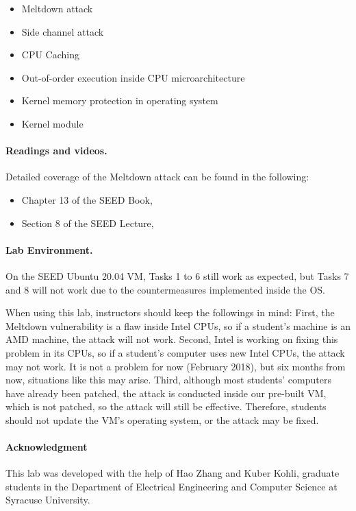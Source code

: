 \begin{itemize}[noitemsep]
\item Meltdown attack 
\item Side channel attack 
\item CPU Caching
\item Out-of-order execution inside CPU microarchitecture
\item Kernel memory protection in operating system
\item Kernel module
\end{itemize} 



\paragraph{Readings and videos.}
Detailed coverage of the Meltdown attack can be found in the following:

\begin{itemize}
\item Chapter 13 of the SEED Book, \seedbook
\item Section 8 of the SEED Lecture, \seedcsvideo
\end{itemize}



\paragraph{Lab Environment.} \seedenvironment  On the SEED Ubuntu 20.04
VM, Tasks 1 to 6 still work as expected, but Tasks 7 and 8 will not work 
due to the countermeasures implemented inside the OS. 

When using this lab, instructors should keep the followings in mind: 
First, the Meltdown vulnerability
is a flaw inside Intel CPUs, so if a student's machine is an AMD machine,
the attack will not work. Second, Intel is working on fixing this
problem in its CPUs, so if a student's computer uses new Intel CPUs, the 
attack may not work. It is not a problem for now (February 2018),
but six months from now, situations like this may arise. 
Third, although most students'
computers have already been patched, the attack is conducted inside our
pre-built VM, which is not patched, so the attack will still be effective.
Therefore, students should not update the VM's operating system, 
or the attack may be fixed.


\paragraph{Acknowledgment} This lab was developed with the help of 
Hao Zhang and Kuber Kohli, graduate students in the Department of
Electrical Engineering and Computer Science at Syracuse University.




